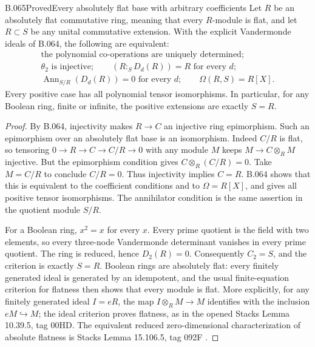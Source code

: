 \begin{saresult}{B.065}{Proved}{Every absolutely flat base with arbitrary coefficients}
Let $R$ be an absolutely flat commutative ring,
meaning that every $R$-module is flat, and let
$R\subset S$ be any unital commutative extension.
With the explicit Vandermonde ideals of B.064,
the following are equivalent:
\[
\begin{gathered}
 \text{the polynomial co-operations are uniquely determined};\\
 \theta_2\text{ is injective};\qquad
 (R:_S D_d(R))=R\text{ for every }d;\\
 \operatorname{Ann}_{S/R}(D_d(R))=0\text{ for every }d;\qquad
 \Omega(R,S)=R[X].                                       \tag{B65.1}
\end{gathered}
\]
Every positive case has all polynomial tensor
isomorphisms. In particular, for any Boolean
ring, finite or infinite, the positive
extensions are exactly $S=R$.
\end{saresult}
\begin{proof}
By B.064, injectivity makes $R\to C$ an
injective ring epimorphism. Such an epimorphism
over an absolutely flat base is an isomorphism.
Indeed $C/R$ is flat, so tensoring
$0\to R\to C\to C/R\to0$ with any module
$M$ keeps $M\to C\otimes_R M$ injective.
But the epimorphism condition gives
$C\otimes_R(C/R)=0$. Take $M=C/R$ to conclude
$C/R=0$.
Thus injectivity implies $C=R$. B.064 shows
that this is equivalent to the coefficient
conditions and to $\Omega=R[X]$, and gives
all positive tensor isomorphisms. The
annihilator condition is the same assertion
in the quotient module $S/R$.

For a Boolean ring, $x^2=x$ for every $x$.
Every prime quotient is the field with two
elements, so every three-node Vandermonde
determinant vanishes in every prime quotient.
The ring is reduced, hence $D_2(R)=0$.
Consequently $C_2=S$, and the criterion is
exactly $S=R$. Boolean rings are absolutely
flat: every finitely generated ideal is
generated by an idempotent, and the usual
finite-equation criterion for flatness then
shows that every module is flat. More
explicitly, for any finitely generated ideal
$I=eR$, the map $I\otimes_R M\to M$ identifies
with the inclusion $eM\hookrightarrow M$;
the ideal criterion proves flatness, as in the opened
Stacks Lemma 10.39.5, tag 00HD. The equivalent
reduced zero-dimensional characterization of absolute
flatness is Stacks Lemma 15.106.5, tag 092F
\cite{StacksAbsoluteFlat}.
\end{proof}
